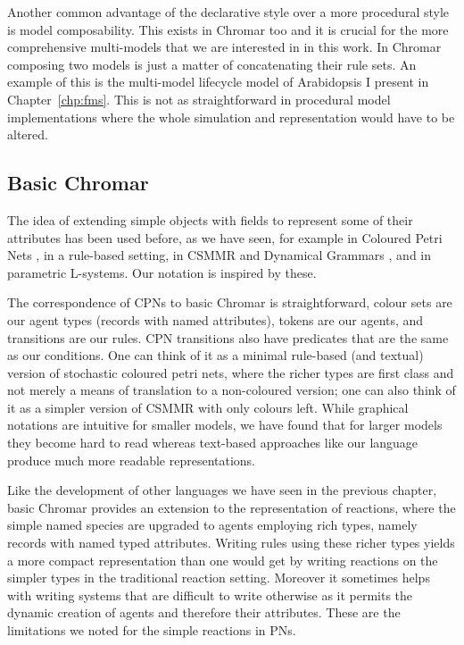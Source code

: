 Another common advantage of the declarative style over a more procedural style
is model composability. This exists in Chromar too and it is crucial for the
more comprehensive multi-models that we are interested in in this work. In
Chromar composing two models is just a matter of concatenating their rule
sets. An example of this is the multi-model lifecycle model of Arabidopsis I
present in Chapter~\ref{chp:fms}. This is not as straightforward in procedural
model implementations where the whole simulation and representation would have
to be altered.


\subsection{Basic Chromar}
The idea of extending simple objects with fields to represent some of their
attributes has been used before, as we have seen, for example in Coloured Petri
Nets \citep{jensen_coloured_1987}, in a rule-based setting, in CSMMR
\citep{oury_coloured_2011} and Dynamical Grammars \citep{mjolsness2006stochastic},
and in parametric L-systems. Our notation is inspired by these.

The correspondence of CPNs to basic Chromar is straightforward, colour sets are
our agent types (records with named attributes), tokens are our agents, and
transitions are our rules. CPN transitions also have predicates that are the
same as our conditions. One can think of it as a minimal rule-based (and
textual) version of stochastic coloured petri nets, where the richer types are
first class and not merely a means of translation to a non-coloured version; one
can also think of it as a simpler version of CSMMR with only colours left. While
graphical notations are intuitive for smaller models, we have found that for
larger models they become hard to read whereas text-based approaches like our
language produce much more readable representations.

Like the development of other languages we have seen in the previous chapter,
basic Chromar provides an extension to the representation of reactions, where
the simple named species are upgraded to agents employing rich types, namely
records with named typed attributes. Writing rules using these richer types
yields a more compact representation than one would get by writing reactions on
the simpler types in the traditional reaction setting. Moreover it sometimes
helps with writing systems that are difficult to write otherwise as it permits
the dynamic creation of agents and therefore their attributes. These are the
limitations we noted for the simple reactions in PNs.


